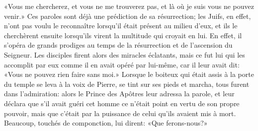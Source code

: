  «Vous me chercherez, et vous ne me trouverez pas,
	et là où je suis vous ne pouvez venir.»
Ces paroles sont déjà une prédiction de sa résurrection;
	les Juifs, en effet, n’ont pas voulu le reconnaître
	lorsqu’il était présent au milieu d’eux,
	et ils le cherchèrent ensuite
		lorsqu’ils virent la multitude qui croyait en lui.
En effet, il s’opéra de grands prodiges
	au temps de la résurrection et de l’ascension du Seigneur.
Les disciples firent alors des miracles éclatants,
	mais ce fut lui qui les accomplit par eux
		comme il en avait opéré par lui-même, car il leur avait dit:
	«Vous ne pouvez rien faire sans moi.»
Lorsque le boiteux qui était assis à la porte du temple
	se leva à la voix de Pierre, se tint sur ses pieds et marcha,
	tous furent dans l’admiration:
	alors le Prince des Apôtres leur adressa la parole,
	et leur déclara que s’il avait guéri cet homme
	ce n’était point en vertu de son propre pouvoir,
	mais que c’était par la puissance de celui qu’ils avaient mis à mort.
Beaucoup, touchés de componction, lui dirent: «Que ferons-nous?»
